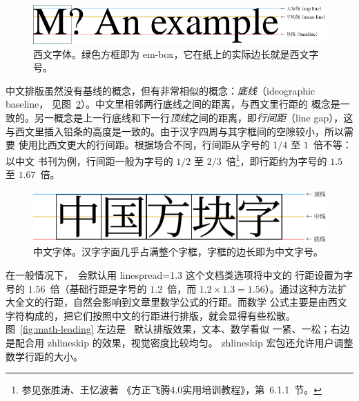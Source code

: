 \documentclass[
  zihao=5,
  no-math,a4paper]{ctexart}
\newcommand\pkg[1]{{\normalfont\ttfamily#1}}
\newcommand\opt[1]{{\normalfont\ttfamily#1}}
\begin{document}
\begin{figure}[h]
\centering
\includegraphics{Latinmetrics}
\caption[西文字体]{西文字体。绿色方框即为 em-box，它在纸上的实际边长就是西文字号。}
\label{fig:eng-font-size}
\end{figure}

中文排版虽然没有基线的概念，但有非常相似的概念：\emph{底线}（ideographic baseline，
见图~\ref{fig:chi-font-size}）。中文里相邻两行底线之间的距离，与西文里行距的
概念是一致的。另一概念是上一行底线和下一行\emph{顶线}之间的距离，即\emph{行间距}（line
gap），这与西文里插入铅条的高度是一致的。由于汉字四周与其字框间的空隙较小，所以需要
使用比西文更大的行间距。根据场合不同，行间距从字号的 $1/4$ 至 $1$~倍不等：以中文
书刊为例，行间距一般为字号的 $1/2$ 至 $2/3$~倍\footnote{参见张胜涛、王忆波著
《方正飞腾4.0实用培训教程》，第~6.1.1~节。}，即行距约为字号的 $1.5$ 至 $1.67$~倍。

\begin{figure}[h]
\centering
\includegraphics{CJKmetrics}
\caption[中文字体]{中文字体。汉字字面几乎占满整个字框，字框的边长即为中文字号。}
\label{fig:chi-font-size}
\end{figure}

在一般情况下，\CTeX\ 会默认用 \opt{linespread=1.3} 这个文档类选项将中文的
行距设置为字号的 $1.56$~倍（基础行距是字号的 $1.2$~倍，而 $1.2 \times 1.3
= 1.56$）。通过这种方法扩大全文的行距，自然会影响到文章里数学公式的行距。而数学
公式主要是由西文字符构成的，把它们按照中文的行距进行排版，就会显得有些松散。
图~\ref{fig:math-leading} 左边是 \CTeX\ 默认排版效果，文本、数学看似
一紧、一松；右边是配合用 \pkg{zhlineskip} 的效果，视觉密度比较均匀。
\pkg{zhlineskip} 宏包还允许用户调整数学行距的大小。
\end{document}
